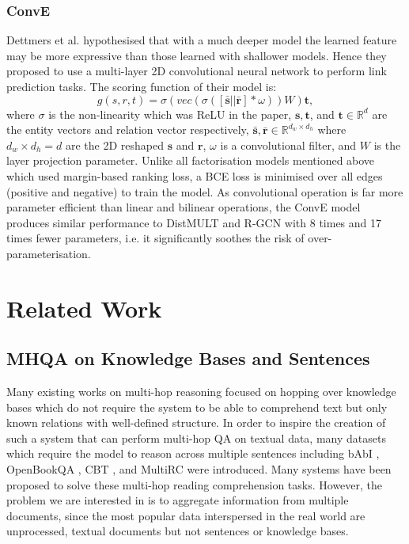 \documentclass[12pt]{report}
\begin{document}
\subsubsection{ConvE}
Dettmers et al. \cite{dettmers_convolutional_2017} hypothesised that with a much deeper model the learned feature may be more expressive than those learned with shallower models. Hence they proposed to use a multi-layer 2D convolutional neural network
to perform link prediction tasks. The scoring function of their model is:
\[g(s,r,t) = \sigma(vec(\sigma([\bar{\mathbf{s}}||\bar{\mathbf{r}}]*\omega))W)\mathbf{t},\]
where $\sigma$ is the non-linearity which was ReLU in the paper, $\mathbf{s}, \mathbf{t}$, and $\mathbf{t} \in \mathbb{R}^d$ are the entity vectors and relation vector respectively, $\bar{\mathbf{s}}, \bar{\mathbf{r}} \in \mathbb{R}^{d_w\times d_h}$ where $d_w\times d_h = d$ are the 2D reshaped $\mathbf{s}$ and $\mathbf{r}$, $\omega$ is a convolutional filter, and $W$ is the layer projection parameter. Unlike all factorisation models mentioned above which used margin-based ranking loss, a BCE loss is minimised over all edges (positive and negative) to train the model. As convolutional operation is far more parameter efficient than linear and bilinear operations, the ConvE model produces similar performance to DistMULT and R-GCN with 8 times and 17 times fewer parameters, i.e. it significantly soothes the risk of over-parameterisation. 


\section{Related Work}
\subsection{MHQA on Knowledge Bases and Sentences}
Many existing works on multi-hop reasoning focused on hopping over knowledge bases \cite{jain_question_2016, neelakantan_neural_2015, yin_neural_2016} which do not require the system to be able to comprehend text but only known relations with well-defined structure. In order to inspire the creation of such a system that can perform multi-hop QA on textual data, many datasets which require the model to reason across multiple sentences including bAbI \cite{weston_towards_2015}, OpenBookQA \cite{mihaylov_can_2018}, CBT \cite{hill_goldilocks_2015}, and MultiRC \cite{shen_reasonet:_2017} were introduced. Many systems \cite{sun_improving_2019, wu_global--local_2019} have been proposed to solve these multi-hop reading comprehension tasks. However, the problem we are interested in is to aggregate information from multiple documents, since the most popular data interspersed in the real world are unprocessed, textual documents but not sentences or knowledge bases.
\end{document}
